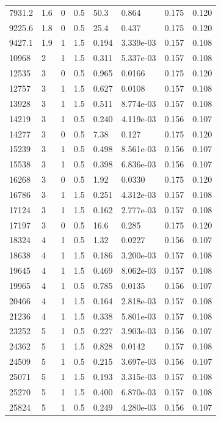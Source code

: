 \documentclass[preview]{standalone}
\begin{document}
{{\begin{tabular}{L{1.2cm}C{1.2cm} C{0.3cm}C{0.5cm} C{1.4cm}C{1.4cm} C{1.4cm}C{1.4cm}}
  7931.2  &   1.6  & 0     & 0.5 &  50.3  & 0.864  & 0.175 &  0.120   \\ 
  9225.6  &   1.8  & 0     & 0.5 &  25.4  & 0.437  & 0.175 &  0.120   \\ 
  9427.1  &   1.9  & 1     & 1.5 &  0.194  & 3.339e-03  & 0.157 &  0.108   \\ 
  10968  &     2  & 1     & 1.5 &  0.311  & 5.337e-03  & 0.157 &  0.108   \\ 
  12535  &     3  & 0     & 0.5 &  0.965  & 0.0166  & 0.175 &  0.120   \\ 
  12757  &     3  & 1     & 1.5 &  0.627  & 0.0108  & 0.157 &  0.108   \\ 
  13928  &     3  & 1     & 1.5 &  0.511  & 8.774e-03  & 0.157 &  0.108   \\ 
  14219  &     3  & 1     & 0.5 &  0.240  & 4.119e-03  & 0.156 &  0.107   \\ 
  14277  &     3  & 0     & 0.5 &  7.38  & 0.127  & 0.175 &  0.120   \\ 
  15239  &     3  & 1     & 0.5 &  0.498  & 8.561e-03  & 0.156 &  0.107   \\ 
  15538  &     3  & 1     & 0.5 &  0.398  & 6.836e-03  & 0.156 &  0.107   \\ 
  16268  &     3  & 0     & 0.5 &  1.92  & 0.0330  & 0.175 &  0.120   \\ 
  16786  &     3  & 1     & 1.5 &  0.251  & 4.312e-03  & 0.157 &  0.108   \\ 
  17124  &     3  & 1     & 1.5 &  0.162  & 2.777e-03  & 0.157 &  0.108   \\ 
  17197  &     3  & 0     & 0.5 &  16.6  & 0.285  & 0.175 &  0.120   \\ 
  18324  &     4  & 1     & 0.5 &  1.32  & 0.0227  & 0.156 &  0.107   \\ 
  18638  &     4  & 1     & 1.5 &  0.186  & 3.200e-03  & 0.157 &  0.108   \\ 
  19645  &     4  & 1     & 1.5 &  0.469  & 8.062e-03  & 0.157 &  0.108   \\ 
  19965  &     4  & 1     & 0.5 &  0.785  & 0.0135  & 0.156 &  0.107   \\ 
  20466  &     4  & 1     & 1.5 &  0.164  & 2.818e-03  & 0.157 &  0.108   \\ 
  21236  &     4  & 1     & 1.5 &  0.338  & 5.801e-03  & 0.157 &  0.108   \\ 
  23252  &     5  & 1     & 0.5 &  0.227  & 3.903e-03  & 0.156 &  0.107   \\ 
  24362  &     5  & 1     & 1.5 &  0.828  & 0.0142  & 0.157 &  0.108   \\ 
  24509  &     5  & 1     & 0.5 &  0.215  & 3.697e-03  & 0.156 &  0.107   \\ 
  25071  &     5  & 1     & 1.5 &  0.193  & 3.315e-03  & 0.157 &  0.108   \\ 
  25270  &     5  & 1     & 1.5 &  0.400  & 6.870e-03  & 0.157 &  0.108   \\ 
  25824  &     5  & 1     & 0.5 &  0.249  & 4.280e-03  & 0.156 &  0.107   \\ 
\hline 
\end{tabular} 

}}
\end{document}
